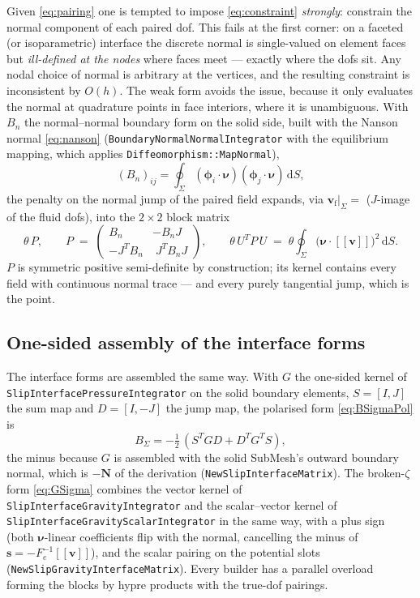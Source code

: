\documentclass[11pt]{article}
\newcommand{\bnu}{\bm{\nu}}
\newcommand{\bN}{\mathbf{N}}
\newcommand{\bs}{\mathbf{s}}
\newcommand{\bv}{\mathbf{v}}
\newcommand{\jump}[1]{[\![#1]\!]}
\newcommand{\dS}{\,\mathrm{d}S}
\begin{document}
Given \eqref{eq:pairing} one is tempted to impose \eqref{eq:constraint}
\emph{strongly}: constrain the normal component of each paired dof. This
fails at the first corner: on a faceted (or isoparametric) interface the
discrete normal is single-valued on element faces but \emph{ill-defined
at the nodes} where faces meet --- exactly where the dofs sit. Any nodal
choice of normal is arbitrary at the vertices, and the resulting
constraint is inconsistent by $O(h)$. The weak form avoids the issue,
because it only evaluates the normal at quadrature points in face
interiors, where it is unambiguous. With $B_n$ the normal--normal
boundary form on the solid side, built with the Nanson normal
\eqref{eq:nanson} (\texttt{BoundaryNormalNormalIntegrator} with the
equilibrium mapping, which applies \texttt{Diffeomorphism::MapNormal}),
\begin{equation}
  (B_n)_{ij} = \oint_{\Sigma} (\bm{\phi}_{i}\cdot\bnu)
               (\bm{\phi}_{j}\cdot\bnu) \dS ,
\end{equation}
the penalty on the normal jump of the paired field expands, via
$\bv_{\mathrm{f}}|_{\Sigma} = $ ($J$-image of the fluid dofs), into the
$2\times 2$ block matrix
\begin{equation}
  \theta\, P, \qquad
  P \;=\;
  \begin{pmatrix}
    B_n & -B_n J \\
    -J^{T} B_n & \;J^{T} B_n J
  \end{pmatrix},
  \qquad
  \theta\, U^{T} P\, U
  \;=\; \theta \oint_{\Sigma} \bigl( \bnu\cdot\jump{\bv} \bigr)^{2} \dS .
  \label{eq:penaltyblock}
\end{equation}
$P$ is symmetric positive semi-definite by construction; its kernel
contains every field with continuous normal trace --- and every purely
tangential jump, which is the point.

\subsection{One-sided assembly of the interface forms}

The interface forms are assembled the same way. With $G$ the one-sided
kernel of \texttt{SlipInterfacePressureIntegrator} on the solid
boundary elements, $S = [I, J]$ the sum map and $D = [I, -J]$ the jump
map, the polarised form \eqref{eq:BSigmaPol} is
\begin{equation}
  B_\Sigma = -\tfrac12\,(S^T G D + D^T G^T S),
\end{equation}
the minus because $G$ is assembled with the solid SubMesh's outward
boundary normal, which is $-\bN$ of the derivation
(\texttt{NewSlipInterfaceMatrix}). The broken-$\zeta$ form
\eqref{eq:GSigma} combines the vector kernel of
\texttt{SlipInterfaceGravityIntegrator} and the scalar--vector kernel of
\texttt{SlipInterfaceGravityScalarIntegrator} in the same way, with a
plus sign (both $\bnu$-linear coefficients flip with the normal,
cancelling the minus of $\bs = -F_e^{-1}\jump{\bv}$), and the scalar
pairing on the potential slots (\texttt{NewSlipGravityInterfaceMatrix}).
Every builder has a parallel overload forming the blocks by hypre
products with the true-dof pairings.
\end{document}
